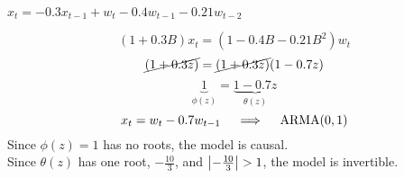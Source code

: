 $x_t = -0.3x_{t-1} + w_t - 0.4w_{t-1} - 0.21w_{t-2}$

$$(1+0.3B)x_t = (1-0.4B-0.21B^2)w_t$$
$$\cancel{(1+0.3z)} = \cancel{(1+0.3z)}(1-0.7z)$$
$$\underbrace{1}_{\phi(z)} = \underbrace{1-0.7z}_{\theta(z)}$$
$$x_t = w_t - 0.7w_{t-1} \quad \implies \quad \operatorname{ARMA}(0,1)$$
Since $\phi(z) = 1$ has no roots, the model is causal.\\
Since $\theta(z)$ has one root, $-\frac{10}{3}$, and $\abs{-\frac{10}{3}} > 1$, the model is invertible.